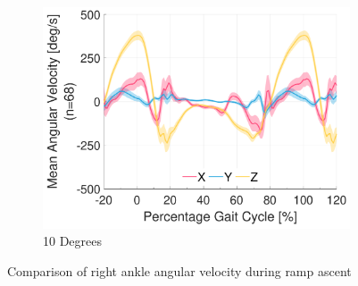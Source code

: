 \begin{figure}[!p]
\begin{subfigure}[b]{0.3\textwidth}
        \includegraphics[width=\textwidth]{content/3-Methods/ramp/ch3_ramp_10_degree_activity_ramp_up_gyro_r_ankle.pdf}
        \caption{10 Degrees}
    \end{subfigure}
    \caption{Comparison of right ankle angular velocity during ramp ascent}
    \label{fig:ramp_up_gyro_comparison}
\end{figure}

